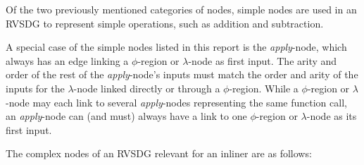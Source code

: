 Of the two previously mentioned categories of nodes, simple nodes are used in an
RVSDG to represent simple operations, such as addition and subtraction.

A special case of the simple nodes listed in this report is the
\textit{apply}-node, which always has an edge linking a $\phi$-region or
$\lambda$-node as first input. The arity and order of the rest of the
\textit{apply}-node's inputs must match the order and arity of the inputs for
the $\lambda$-node linked directly or through a $\phi$-region. While a
$\phi$-region or $\lambda$-node may each link to several \textit{apply}-nodes
representing the same function call, an \textit{apply}-node can (and must)
always have a link to one $\phi$-region or $\lambda$-node as its first input.

The complex nodes of an RVSDG relevant for an inliner are as follows:

